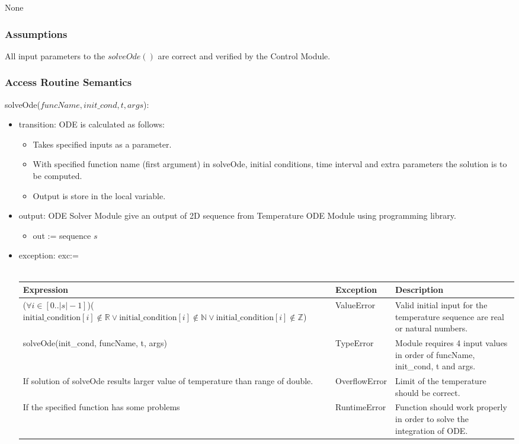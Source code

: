 \documentclass[12pt, titlepage]{article}
\begin{document}
None

\subsubsection{Assumptions}

All input parameters to the $solveOde()$ are correct and verified by the Control Module. 

\subsubsection{Access Routine Semantics}

\noindent solveOde($funcName, init\_cond, t, args$):
\begin{itemize}
\item transition: ODE is calculated as follows: 
\begin{itemize}
    \item Takes specified inputs as a parameter. 
    \item With specified function name (first argument) in solveOde, initial conditions, time interval and extra parameters the solution is to be computed. 
    \item Output is store in the local variable. 
\end{itemize}


\item output: ODE Solver Module give an output of 2D sequence from Temperature ODE Module using programming library. 
\begin{itemize}
    \item out := sequence $s$ 
\end{itemize}

\item exception: exc:= \\ \\ 
\begin{tabular}{p{7cm} p{3.5cm} p{4cm}}
 \hline
 \textbf{Expression} & \textbf{Exception} & \textbf{Description} \\
 \hline
     ($\forall i \in [0..|s|-1]$)($\text{initial\_condition}[i] \notin \mathbb{R} \vee \text{initial\_condition}[i] \notin \mathbb{N} \vee \text{initial\_condition}[i] \notin \mathbb{Z}$) & ValueError & Valid initial input for the temperature sequence are real or natural numbers. \\
  \hline
      solveOde(init\_cond, funcName, t, args)  & TypeError & Module requires 4 input values in order of funcName, init\_cond, t and args.  \\
    \hline
    If solution of solveOde results larger value of temperature than range of double. & OverflowError & Limit of the temperature should be correct. \\
    \hline 
    If the specified function has some problems &  RuntimeError & Function should work properly in order to solve the integration of ODE. \\ 
    \hline
 \end{tabular}
\end{itemize}
\end{document}
